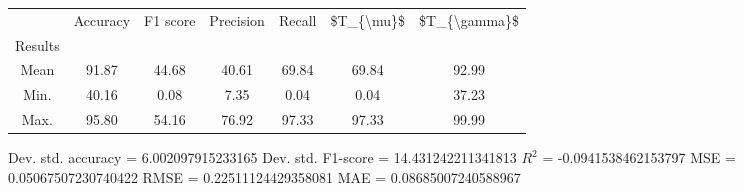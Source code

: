 \begin{tabular}{|c|c|c|c|c|c|c|}
\toprule
{} &  Accuracy &  F1 score &  Precision &  Recall &  \$T\_\{\textbackslash mu\}\$ &  \$T\_\{\textbackslash gamma\}\$ \\
Results &           &           &            &         &            &               \\
\hline
Mean    &     91.87 &     44.68 &      40.61 &   69.84 &      69.84 &         92.99 \\
Min.    &     40.16 &      0.08 &       7.35 &    0.04 &       0.04 &         37.23 \\
Max.    &     95.80 &     54.16 &      76.92 &   97.33 &      97.33 &         99.99 \\
\bottomrule
\end{tabular}

 Dev. std. accuracy = 6.002097915233165
 Dev. std. F1-score = 14.431242211341813
 $R^2$ = -0.0941538462153797
 MSE = 0.05067507230740422
 RMSE = 0.22511124429358081
 MAE = 0.08685007240588967